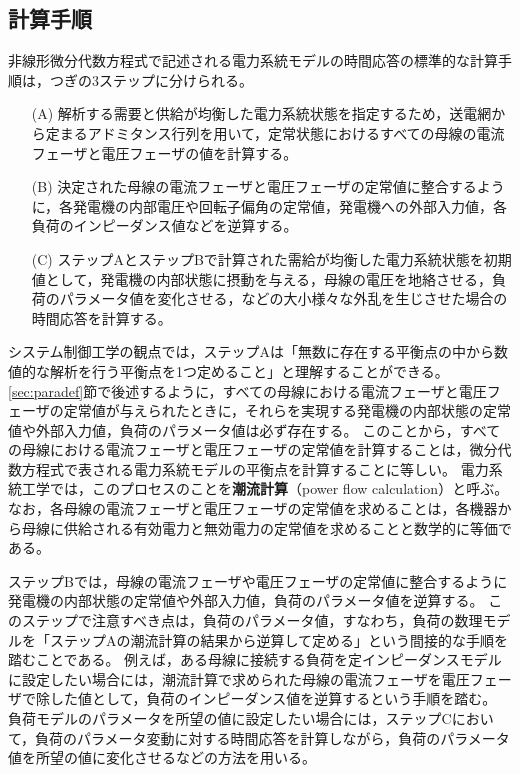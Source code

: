 \documentclass[tombow,dvipdfmx]{corona-a5-1.1}
\begin{document}
\subsection{計算手順}\label{sec:numstep}

非線形微分代数方程式で記述される電力系統モデルの時間応答の標準的な計算手順は，つぎの3ステップに分けられる。

\medskip
\begin{breakbox}
\begin{itemize}
\item[(A)] 解析する需要と供給が均衡した電力系統状態を指定するため，送電網から定まるアドミタンス行列を用いて，定常状態におけるすべての母線の電流フェーザと電圧フェーザの値を計算する。
\item[(B)] 決定された母線の電流フェーザと電圧フェーザの定常値に整合するように，各発電機の内部電圧や回転子偏角の定常値，発電機への外部入力値，各負荷のインピーダンス値などを逆算する。
\item[(C)] ステップAとステップBで計算された需給が均衡した電力系統状態を初期値として，発電機の内部状態に摂動を与える，母線の電圧を地絡させる，負荷のパラメータ値を変化させる，などの大小様々な外乱を生じさせた場合の時間応答を計算する。
\end{itemize}
\end{breakbox}
\medskip

システム制御工学の観点では，ステップAは「無数に存在する平衡点の中から数値的な解析を行う平衡点を1つ定めること」と理解することができる。
\ref{sec:paradef}節で後述するように，すべての母線における電流フェーザと電圧フェーザの定常値が与えられたときに，それらを実現する発電機の内部状態の定常値や外部入力値，負荷のパラメータ値は必ず存在する。
このことから，すべての母線における電流フェーザと電圧フェーザの定常値を計算することは，微分代数方程式で表される電力系統モデルの平衡点を計算することに等しい。
電力系統工学では，このプロセスのことを\textbf{潮流計算}（power flow calculation）と呼ぶ。
なお，各母線の電流フェーザと電圧フェーザの定常値を求めることは，各機器から母線に供給される有効電力と無効電力の定常値を求めることと数学的に等価である。

ステップBでは，母線の電流フェーザや電圧フェーザの定常値に整合するように発電機の内部状態の定常値や外部入力値，負荷のパラメータ値を逆算する。
このステップで注意すべき点は，負荷のパラメータ値，すなわち，負荷の数理モデルを「ステップAの潮流計算の結果から逆算して定める」という間接的な手順を踏むことである。
例えば，ある母線に接続する負荷を定インピーダンスモデルに設定したい場合には，潮流計算で求められた母線の電流フェーザを電圧フェーザで除した値として，負荷のインピーダンス値を逆算するという手順を踏む。
負荷モデルのパラメータを所望の値に設定したい場合には，ステップCにおいて，負荷のパラメータ変動に対する時間応答を計算しながら，負荷のパラメータ値を所望の値に変化させるなどの方法を用いる。
\end{document}
